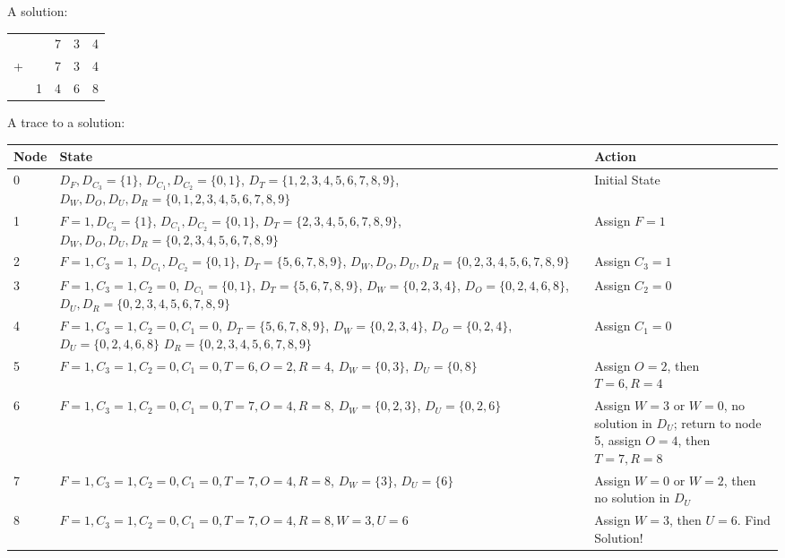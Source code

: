 \documentclass{article}
\begin{document}
\begin{enumerate}
A solution: 
\begin{table}[ht]
\centering
\begin{tabular}{lllll}
  &   & 7 & 3 & 4 \\
+ &   & 7 & 3 & 4 \\ \hline
  & 1 & 4 & 6 & 8
\end{tabular}
\end{table}

A trace to a solution:
\begin{table}[ht]
\centering
\begin{tabular}{|m{0.05\linewidth}<{\centering}|m{0.7\linewidth}<{\centering}|m{0.25\linewidth}|}
\hline
Node & State & Action \\
\hline
0 & 
$ D_F,D_{C_3} = \{1\} $,
$ D_{C_1},D_{C_2} = \{0,1\} $,
$ D_T = \{1,2,3,4,5,6,7,8,9\} $,
$ D_W,D_O,D_U,D_R = \{0,1,2,3,4,5,6,7,8,9\} $
& Initial State \\
\hline  
1 & 
$ F=1,D_{C_3}=\{1\} $,
$ D_{C_1},D_{C_2} = \{0,1\} $,
$ D_T = \{2,3,4,5,6,7,8,9\} $,
$ D_W,D_O,D_U,D_R = \{0,2,3,4,5,6,7,8,9\} $
& Assign $F=1$ \\
\hline  
2 & 
$ F=1,C_3=1 $,
$ D_{C_1},D_{C_2} = \{0,1\} $,
$ D_T = \{5,6,7,8,9\} $,
$ D_W,D_O,D_U,D_R = \{0,2,3,4,5,6,7,8,9\} $
& Assign $C_3=1$ \\
\hline
3 & 
$ F=1,C_3=1,C_2=0 $,
$ D_{C_1} = \{0,1\} $,
$ D_T = \{5,6,7,8,9\} $,
$ D_W = \{0,2,3,4\} $,
$ D_O = \{0,2,4,6,8\} $,
$ D_U,D_R = \{0,2,3,4,5,6,7,8,9\} $
& Assign $C_2=0$ \\
\hline     
4 & 
$ F=1,C_3=1,C_2=0,C_1=0 $,
$ D_T = \{5,6,7,8,9\} $,
$ D_W = \{0,2,3,4\} $,
$ D_O = \{0,2,4\} $,
$ D_U = \{0,2,4,6,8\} $
$ D_R = \{0,2,3,4,5,6,7,8,9\} $
& Assign $C_1=0$ \\
\hline      
5 & 
$ F=1,C_3=1,C_2=0,C_1=0, T=6,O=2,R=4 $,
$ D_W = \{0,3\} $,
$ D_U = \{0,8\} $
& Assign $O=2$, then $T=6,R=4$ \\
\hline   
6 & 
$ F=1,C_3=1,C_2=0,C_1=0, T=7,O=4,R=8 $,
$ D_W = \{0,2,3\} $,
$ D_U = \{0,2,6\} $
& Assign $W=3$ or $W=0$, no solution in $D_U$; return to node 5, assign $O=4$, then $T=7,R=8$ \\
\hline
7 & 
$ F=1,C_3=1,C_2=0,C_1=0, T=7,O=4,R=8 $,
$ D_W = \{3\} $,
$ D_U = \{6\} $
& Assign $W=0$ or $W=2$, then no solution in $D_U$ \\
\hline  
8 & 
$ F=1,C_3=1,C_2=0,C_1=0, T=7,O=4,R=8,W=3,U=6 $
& Assign $W=3$, then $U=6$. Find Solution! \\
\hline    
\end{tabular}
\end{table}



\end{enumerate}
\end{document}

